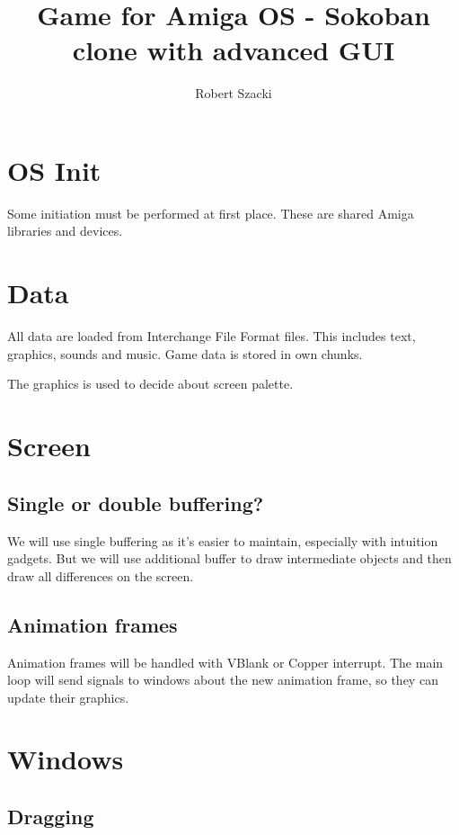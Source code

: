 \documentclass[12pt]{article}
\author{Robert Szacki}
\title{Game for Amiga OS - Sokoban clone with advanced GUI}
\begin{document}
\maketitle
\section{OS Init}

Some initiation must be performed at first place. These are shared Amiga libraries and devices.

\section{Data}

All data are loaded from Interchange File Format files. This includes text, graphics, sounds and music. Game data is stored in own chunks.

The graphics is used to decide about screen palette.

\section{Screen}

\subsection{Single or double buffering?}

We will use single buffering as it's easier to maintain, especially with intuition gadgets. But we will use
additional buffer to draw intermediate objects and then draw all differences on the screen.

\subsection{Animation frames}

Animation frames will be handled with VBlank or Copper interrupt. The main loop will send signals to windows
about the new animation frame, so they can update their graphics.

\section{Windows}

\subsection{Dragging}
\end{document}
